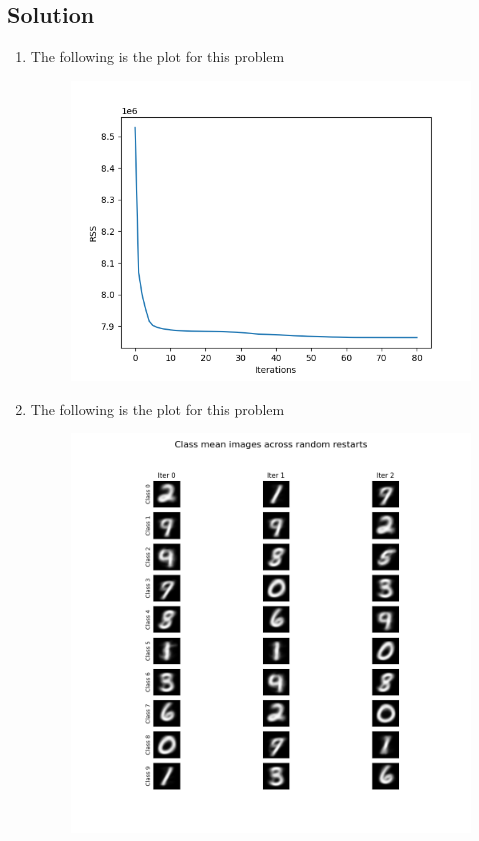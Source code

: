 \documentclass[submit]{harvardml}
\begin{document}
\subsection*{Solution}
\begin{enumerate}

\item The following is the plot for this problem 
\begin{figure}[h]
\includegraphics[width=\linewidth]{part1plot}
\end{figure}

\newpage
\item The following is the plot for this problem 
\begin{figure}[h]
\includegraphics[width=\linewidth]{part2plot}
\end{figure}


\end{enumerate}
\end{document}
